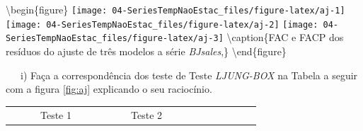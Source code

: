 \documentclass[
]{book}
\theoremstyle{definition}
\theoremstyle{definition}
\theoremstyle{definition}
\theoremstyle{remark}
\begin{document}
\textbackslash begin\{figure\}
\texttt{[image: 04-SeriesTempNaoEstac\_files/figure-latex/aj-1]} \texttt{[image: 04-SeriesTempNaoEstac\_files/figure-latex/aj-2]} \texttt{[image: 04-SeriesTempNaoEstac\_files/figure-latex/aj-3]} \textbackslash caption\{FAC e FACP dos resíduos do ajuste de três modelos a série \emph{BJsales},\}\label{fig:aj}
\textbackslash end\{figure\}

~~~i) Faça a correspondência dos teste de Teste \emph{LJUNG-BOX} na Tabela a seguir com a figura \ref{fig:aj} explicando o seu raciocínio.

\begin{longtable}[]{@{}lllllllllllllllllll@{}}
\toprule
\begin{minipage}[b]{0.05\columnwidth}\raggedright
\strut
\end{minipage} & \begin{minipage}[b]{0.04\columnwidth}\raggedright
\strut
\end{minipage} & \begin{minipage}[b]{0.02\columnwidth}\raggedright
\strut
\end{minipage} & \begin{minipage}[b]{0.03\columnwidth}\raggedright
Teste 1\strut
\end{minipage} & \begin{minipage}[b]{0.02\columnwidth}\raggedright
\strut
\end{minipage} & \begin{minipage}[b]{0.04\columnwidth}\raggedright
\strut
\end{minipage} & \begin{minipage}[b]{0.05\columnwidth}\raggedright
\strut
\end{minipage} & \begin{minipage}[b]{0.04\columnwidth}\raggedright
\strut
\end{minipage} & \begin{minipage}[b]{0.02\columnwidth}\raggedright
\strut
\end{minipage} & \begin{minipage}[b]{0.03\columnwidth}\raggedright
Teste 2\strut
\end{minipage} & \begin{minipage}[b]{0.02\columnwidth}\raggedright
\strut
\end{minipage} & \begin{minipage}[b]{0.03\columnwidth}\raggedright
\strut
\end{minipage} & \begin{minipage}[b]{0.05\columnwidth}\raggedright

\end{minipage}
\end{longtable}
\end{document}
